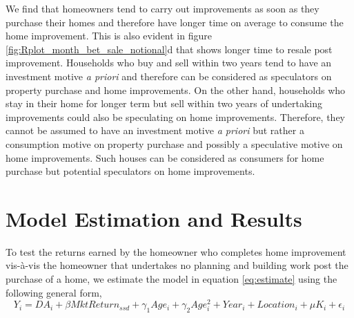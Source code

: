 \documentclass[AEJ,reqno, draftmode]{AEA} %
\begin{document}
We find that homeowners tend to carry out improvements as soon as they purchase their homes and therefore have longer time on average to consume the home improvement. This is also evident in figure \ref{fig:Rplot_month_bet_sale_notional}d that shows longer time to resale post improvement. Households who buy and sell within two years tend to have an investment motive \textit{a priori} and therefore can be considered as speculators on property purchase and home improvements. On the other hand, households who stay in their home for longer term but sell within two years of undertaking improvements could also be speculating on home improvements. Therefore, they cannot be assumed to have an investment motive \textit{a priori} but rather a consumption motive on property purchase and possibly a speculative motive on home improvements. Such houses can be considered as consumers for home purchase but potential speculators on home improvements.






\section{Model Estimation and Results}


To test the returns earned by the homeowner who completes home improvement vis-à-vis the homeowner that undertakes no planning and building work post the purchase of a home, we estimate the model in equation \ref{eq:estimate} using the following general form,
\begin{equation} \label{eq: main_equation}
    Y_i = DA_i + \beta{MktReturn_{ssd}} + \gamma_1{Age_i} + \gamma_2{Age_i^2} + Year_i + Location_i + \mu{K_i} + \epsilon_i
\end{equation}
\end{document}
